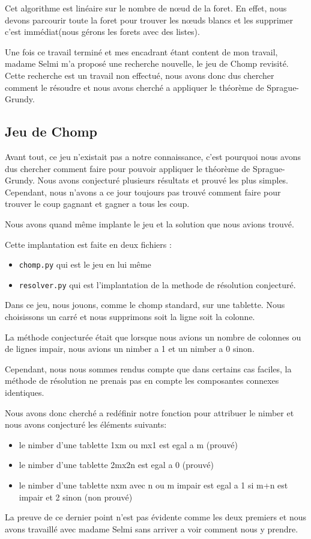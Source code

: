 Cet algorithme est linéaire sur le nombre de nœud de la foret. En effet, nous devons parcourir toute la foret pour trouver les nœuds blancs et les supprimer c'est immédiat(nous gérons les forets avec des listes).

Une fois ce travail terminé et mes encadrant étant content de mon travail, madame Selmi m'a proposé une recherche nouvelle, le jeu de Chomp revisité. Cette recherche est un travail non effectué, nous avons donc dus chercher comment le résoudre et nous avons cherché a appliquer le théorème de Sprague-Grundy.

\subsection{Jeu de Chomp}
\label{sub:Jeu de Chomp}

Avant tout, ce jeu n'existait pas a notre connaissance, c'est pourquoi nous avons dus chercher comment faire pour pouvoir appliquer le théorème de Sprague-Grundy. Nous avons conjecturé plusieurs résultats et prouvé les plus simples. Cependant, nous n'avons a ce jour toujours pas trouvé comment faire pour trouver le coup gagnant et gagner a tous les coup.

Nous avons quand même implante le jeu et la solution que nous avions trouvé. 

Cette implantation est faite en deux fichiers :
\begin{itemize}
  \item \texttt{chomp.py} qui est le jeu en lui même
  \item \texttt{resolver.py} qui est l'implantation de la methode de résolution conjecturé.
\end{itemize}

Dans ce jeu, nous jouons, comme le chomp standard, sur une tablette. Nous choisissons un carré et nous supprimons soit la ligne soit la colonne. 

La méthode conjecturée était que lorsque nous avions un nombre de colonnes ou de lignes impair, nous avions un nimber a 1 et un nimber a 0 sinon.

Cependant, nous nous sommes rendus compte que dans certains cas faciles, la méthode de résolution ne prenais pas en compte les composantes connexes identiques.

Nous avons donc cherché a redéfinir notre fonction pour attribuer le nimber et nous avons conjecturé les éléments suivants:
\begin{itemize}
  \item le nimber d'une tablette 1xm ou mx1 est egal a m (prouvé)
  \item le nimber d'une tablette 2mx2n est egal a 0 (prouvé)
  \item le nimber d'une tablette nxm avec n ou m impair est egal a 1 si m+n est impair et 2 sinon (non prouvé)
\end{itemize}

La preuve de ce dernier point n'est pas évidente comme les deux premiers et nous avons travaillé avec madame Selmi sans arriver a voir comment nous y prendre.